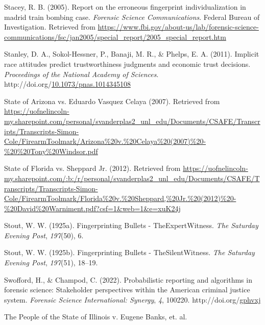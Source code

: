 \documentclass[print]{nuthesis}
\newlength{\cslhangindent}
\newenvironment{CSLReferences}[2]%
{\setlength{\parindent}{0pt}%
\everypar{\setlength{\hangindent}{\cslhangindent}}\ignorespaces}%
{\par}
\begin{document}
\begin{CSLReferences}{1}{0}
\leavevmode{}%
Stacey, R. B. (2005). Report on the erroneous fingerprint individualization in madrid train bombing case. \emph{Forensic Science Communications}. {Federal Bureau of Investigation}. Retrieved from \url{https://www.fbi.gov/about-us/lab/forensic-science-communications/fsc/jan2005/special_report/2005_special_report.htm}

\leavevmode{}%
Stanley, D. A., Sokol-Hessner, P., Banaji, M. R., \& Phelps, E. A. (2011). Implicit race attitudes predict trustworthiness judgments and economic trust decisions. \emph{Proceedings of the National Academy of Sciences}. http://doi.org/\href{https://doi.org/10.1073/pnas.1014345108}{10.1073/pnas.1014345108}

\leavevmode{}%
State of {Arizona} vs. Eduardo {Vasquez} {Celaya} (2007). Retrieved from \url{https://uofnelincoln-my.sharepoint.com/personal/svanderplas2_unl_edu/Documents/CSAFE/Transcripts/Transcripts-Simon-Cole/FirearmToolmark/Arizona\%20v.\%20Celaya\%20(2007)\%20-\%20\%20Tony\%20Windsor.pdf}

\leavevmode{}%
State of {Florida} vs. Sheppard {Jr.} (2012). Retrieved from \url{https://uofnelincoln-my.sharepoint.com/:b:/r/personal/svanderplas2_unl_edu/Documents/CSAFE/Transcripts/Transcripts-Simon-Cole/FirearmToolmark/Florida\%20v.\%20Sheppard,\%20Jr.\%20(2012)\%20-\%20David\%20Warniment.pdf?csf=1\&web=1\&e=xuK24j}

\leavevmode{}%
Stout, W. W. (1925a). {Fingerprinting} {Bullets} - {The}{Expert}{Witness}. \emph{The {Saturday} {Evening} {Post}}, \emph{197}(50), 6.

\leavevmode{}%
Stout, W. W. (1925b). {Fingerprinting} {Bullets} - {The}{Silent}{Witness}. \emph{The {Saturday} {Evening} {Post}}, \emph{197}(51), 18--19.

\leavevmode{}%
Swofford, H., \& Champod, C. (2022). Probabilistic reporting and algorithms in forensic science: {Stakeholder} perspectives within the {American} criminal justice system. \emph{Forensic Science International: Synergy}, \emph{4}, 100220. http://doi.org/\href{https://doi.org/gphvxj}{gphvxj}

\leavevmode{}%
The {People} of the {State} of {Illinois} v. Eugene {Banks}, et. al.


\end{CSLReferences}
\end{document}
